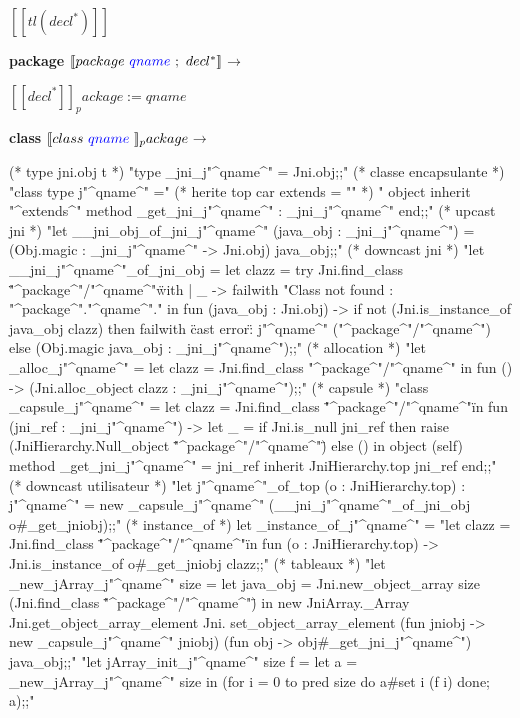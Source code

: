 \documentclass[a4paper, 11pt]{report}
\begin{document}
$[\![ tl(decl^*) ]\!]$ 
\newline
\ 
\newline

\textbf{package}
\newline
\noindent
$[\![ package\ {\color{blue}qname}\ ;\ decl^* ]\!]$$\longrightarrow$

$[\![ decl^* ]\!]_package:=qname$ 
\newline
\ 
\newline

\textbf{class}
\newline
\noindent
$[\![ class\ {\color{blue}qname}\ ]\!]_package$$\longrightarrow$
\begin{OCaml}
(* type jni.obj t *)
"type _jni_j"^qname^" = Jni.obj;;"
(* classe encapsulante *)
"class type j"^qname^" ="
(* herite top car extends = "" *)
 " object inherit "^extends^" method _get_jni_j"^qname^" : _jni_j"^qname^"
  end;;"
(* upcast jni *)
"let __jni_obj_of_jni_j"^qname^" (java_obj : _jni_j"^qname^") =
  (Obj.magic : _jni_j"^qname^" -> Jni.obj) java_obj;;"
(* downcast jni *)
"let __jni_j"^qname^"_of_jni_obj =
  let clazz =
    try Jni.find_class \""^package^"/"^qname^"\"
    with | _ -> failwith "Class not found : "^package^"."^qname^"."
  in
    fun (java_obj : Jni.obj) ->
      if not (Jni.is_instance_of java_obj clazz)
      then failwith \"cast error\" : j"^qname^" ("^package^"/"^qname^")
      else (Obj.magic java_obj : _jni_j"^qname^");;"
(* allocation *)
"let _alloc_j"^qname^" =
  let clazz = Jni.find_class "^package^"/"^qname^"
  in fun () -> (Jni.alloc_object clazz : _jni_j"^qname^");;"
(* capsule *)
"class _capsule_j"^qname^" =
  let clazz = Jni.find_class \""^package^"/"^qname^"\"
  in
    fun (jni_ref : _jni_j"^qname^") ->
      let _ =
        if Jni.is_null jni_ref
        then raise (JniHierarchy.Null_object \""^package^"/"^qname^"\")
        else ()
      in
        object (self)
          method _get_jni_j"^qname^" = jni_ref
          inherit JniHierarchy.top jni_ref
        end;;"
(* downcast utilisateur *)
"let j"^qname^"_of_top (o : JniHierarchy.top) : j"^qname^" =
  new _capsule_j"^qname^" (__jni_j"^qname^"_of_jni_obj o#_get_jniobj);;"
(* instance_of *)
let _instance_of_j"^qname^" =
 "let clazz = Jni.find_class \""^package^"/"^qname^"\"
  in fun (o : JniHierarchy.top) -> Jni.is_instance_of o#_get_jniobj clazz;;"
(* tableaux *)
"let _new_jArray_j"^qname^" size =
  let java_obj = Jni.new_object_array size (Jni.find_class \""^package^"/"^qname^"\")
  in
    new JniArray._Array Jni.get_object_array_element Jni.
      set_object_array_element (fun jniobj -> new _capsule_j"^qname^" jniobj)
      (fun obj -> obj#_get_jni_j"^qname^") java_obj;;"
"let jArray_init_j"^qname^" size f =
  let a = _new_jArray_j"^qname^" size
  in (for i = 0 to pred size do a#set i (f i) done; a);;"
\end{OCaml}
\end{document}
